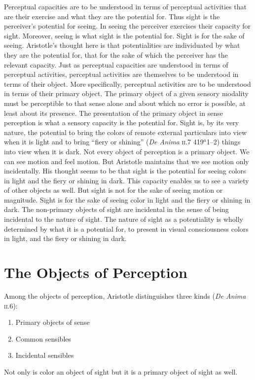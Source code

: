 Perceptual capacities are to be understood in terms of perceptual activities that are their exercise and what they are the potential for. Thus sight is the perceiver's potential for seeing. In seeing the perceiver exercises their capacity for sight. Moreover, seeing is what sight is the potential for. Sight is for the sake of seeing. Aristotle's thought here is that potentialities are individuated by what they are the potential for, that for the sake of which the perceiver has the relevant capacity. Just as perceptual capacities are understood in terms of perceptual activities, perceptual activities are themselves to be understood in terms of their object. More specifically, perceptual activities are to be understood in terms of their primary object. The primary object of a given sensory modality must be perceptible to that sense alone and about which no error is possible, at least about its presence. The presentation of the primary object in sense perception is what a sensory capacity is the potential for. Sight is, by its very nature, the potential to bring the colors of remote external particulars into view when it is light and to bring ``fiery or shining'' (\emph{De Anima} \textsc{ii}.7 419\( ^{a} \)1--2) things into view when it is dark. Not every object of perception is a primary object. We can see motion and feel motion. But Aristotle maintains that we see motion only incidentally. His thought seems to be that sight is the potential for seeing colors in light and the fiery or shining in dark. This capacity enables us to see a variety of other objects as well. But sight is not for the sake of seeing motion or magnitude. Sight is for the sake of seeing color in light and the fiery or shining in dark. The non-primary objects of sight are incidental in the sense of being incidental to the nature of sight. The nature of sight as a potentiality is wholly determined by what it is a potential for, to present in visual consciousness colors in light, and the fiery or shining in dark.


\section{The Objects of Perception} %
\label{sec:the_objects_of_perception}

Among the objects of perception, Aristotle distinguishes three kinds (\emph{De Anima} \textsc{ii}.6):
\begin{enumerate}[(1)]
	\item Primary objects of sense
	\item Common sensibles
	\item Incidental sensibles
\end{enumerate}
Not only is color an object of sight but it is a primary object of sight as well.

